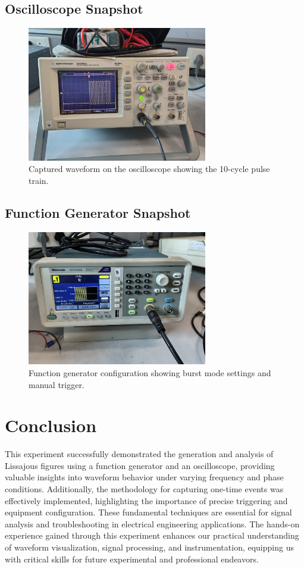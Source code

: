 \documentclass[12pt]{article}
\begin{document}
\subsection*{Oscilloscope Snapshot}
\begin{figure}[H]
    \centering
    \includegraphics[width=0.7\textwidth]{figs/Experiment-2/1.2.1.jpg}
    \caption{Captured waveform on the oscilloscope showing the 10-cycle pulse train.}
    \label{fig:oscilloscope}
\end{figure}

\subsection*{Function Generator Snapshot}
\begin{figure}[H]
    \centering
    \includegraphics[width=0.7\textwidth]{figs/Experiment-2/1.2.2.jpg}
    \caption{Function generator configuration showing burst mode settings and manual trigger.}
    \label{fig:function_generator}
\end{figure}
\section{Conclusion}
This experiment successfully demonstrated the generation and analysis of Lissajous figures using a function generator and an oscilloscope, providing valuable insights into waveform behavior under varying frequency and phase conditions. Additionally, the methodology for capturing one-time events was effectively implemented, highlighting the importance of precise triggering and equipment configuration. These fundamental techniques are essential for signal analysis and troubleshooting in electrical engineering applications. The hands-on experience gained through this experiment enhances our practical understanding of waveform visualization, signal processing, and instrumentation, equipping us with critical skills for future experimental and professional endeavors.
\end{document}
